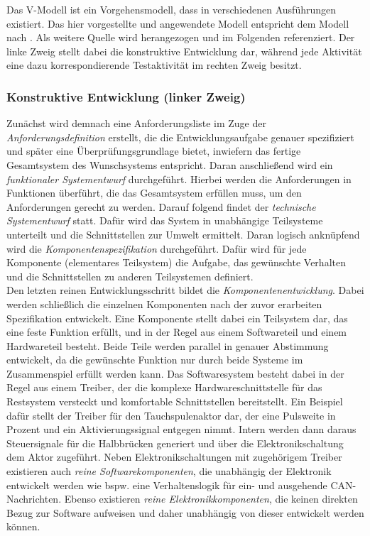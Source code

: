 Das V-Modell ist ein Vorgehensmodell, dass in verschiedenen Ausführungen existiert. Das hier vorgestellte und angewendete Modell entspricht dem Modell nach \cite{Boehm79}. Als weitere Quelle wird \cite{BasSof} herangezogen und im Folgenden referenziert.
Der linke Zweig stellt dabei die konstruktive Entwicklung dar, während jede Aktivität eine dazu korrespondierende Testaktivität im rechten Zweig besitzt. \\

\subsubsection{Konstruktive Entwicklung (linker Zweig)}
Zunächst wird demnach eine Anforderungsliste im Zuge der \textit{Anforderungsdefinition} erstellt, die die Entwicklungsaufgabe genauer spezifiziert und später eine Überprüfungsgrundlage bietet, inwiefern das fertige Gesamtsystem des Wunschsystems entspricht. Daran anschließend wird ein \textit{funktionaler Systementwurf} durchgeführt. Hierbei werden die Anforderungen in Funktionen überführt, die das Gesamtsystem erfüllen muss, um den Anforderungen gerecht zu werden. Darauf folgend findet der \textit{technische Systementwurf} statt. Dafür wird das System in unabhängige Teilsysteme unterteilt und die Schnittstellen zur Umwelt ermittelt. Daran logisch anknüpfend wird die \textit{Komponentenspezifikation} durchgeführt. Dafür wird für jede Komponente (elementares Teilsystem) die Aufgabe, das gewünschte Verhalten und die Schnittstellen zu anderen Teilsystemen definiert. \\
Den letzten reinen Entwicklungsschritt bildet die \textit{Komponentenentwicklung}. Dabei werden schließlich die einzelnen Komponenten nach der zuvor erarbeiten Spezifikation entwickelt. Eine Komponente stellt dabei ein Teilsystem dar, das eine feste Funktion erfüllt, und in der Regel aus einem Softwareteil und einem Hardwareteil besteht. Beide Teile werden parallel in genauer Abstimmung entwickelt, da die gewünschte Funktion nur durch beide Systeme im Zusammenspiel erfüllt werden kann. Das Softwaresystem besteht dabei in der Regel aus einem Treiber, der die komplexe Hardwareschnittstelle für das Restsystem versteckt und komfortable Schnittstellen bereitstellt. Ein Beispiel dafür stellt der Treiber für den Tauchspulenaktor dar, der eine Pulsweite in Prozent und ein Aktivierungssignal entgegen nimmt. Intern werden dann daraus Steuersignale für die Halbbrücken generiert und über die Elektronikschaltung dem Aktor zugeführt.
Neben Elektronikschaltungen mit zugehörigem Treiber existieren auch \textit{reine Softwarekomponenten}, die unabhängig der Elektronik entwickelt werden wie bspw. eine Verhaltenslogik für ein- und ausgehende CAN-Nachrichten. Ebenso existieren \textit{reine Elektronikkomponenten}, die keinen direkten Bezug zur Software aufweisen und daher unabhängig von dieser entwickelt werden können.\\

